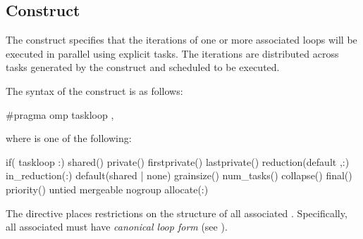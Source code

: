\subsection{ Construct}
\label{subsec:taskloop Construct}
\summary
The  construct specifies that the iterations of one or more 
associated loops will be executed in parallel using explicit tasks. The 
iterations are distributed across tasks generated by the construct and 
scheduled to be executed.
\syntax
\begin{ccppspecific}
The syntax of the  construct is as follows:
\begin{ompcPragma}
#pragma omp taskloop \plc{[clause[[},\plc{] clause] ...] new-line}
\end{ompcPragma}
where  is one of the following:
\begin{indentedcodelist}
if(\plc{[} taskloop :\plc{] scalar-expression})
shared()
private()
firstprivate()
lastprivate()
reduction(\plc{[}default ,\plc{]reduction-identifier }:)
in_reduction(:)
default(shared \textnormal{|} none)
grainsize()
num_tasks()
collapse()
final()
priority()
untied
mergeable
nogroup
allocate(\plc{[allocator }:\plc{] list})
\end{indentedcodelist}

The  directive places restrictions on the structure of all 
associated . Specifically, all associated  
must have \textit{canonical loop form} (see ).
\end{ccppspecific}
